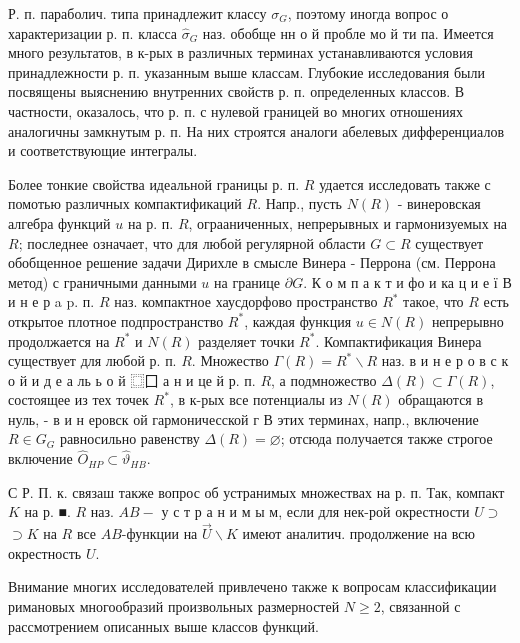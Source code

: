 \documentclass[10pt]{article}
\begin{document}
Р. п. параболич. типа принадлежит классу $\mathfrak{\sigma}_{G}$, поэтому иногда вопрос о характеризации р. п. класса $\widehat{\sigma}_{G}$ наз. обобще нн о й пробле мо й ти па. Имеется много результатов, в к-рых в различных терминах устанавливаются условия принадлежности р. п. указанным выше классам. Глубокие исследования были посвящены выяснению внутренних свойств р. п. определенных классов. В частности, оказалось, что р. п. с нулевой границей во многих отношениях аналогичны замкнутым р. п. На них строятся аналоги абелевых дифференциалов и соответствующие интегралы.



Более тонкие свойства идеальной границы р. п. $R$ удается исследовать также с помотью различных компактификаций $R$. Напр., пусть $N(R)$ - винеровская алгебра функций $u$ на р. п. $R$, ограаниченных, непрерывных и гармонизуемых на $R$; последнее означает, что для любой регулярной области $G \subset R$ существует обобщенное решение задачи Дирихле в смысле Винера - Перрона (см. Перрона метод) с граничными данными $u$ на границе $\partial G$. К о м п а к т и фо и ка ц и е ї В и н е р a p. п. $R$ наз. компактное хаусдорфово пространство $R^{*}$ такое, что $R$ есть открытое плотное подпространство $R^{*}$, каждая функция $u \in N(R)$ непрерывно продолжается на $R^{*}$ и $N(R)$ разделяет точки $R^{*}$. Компактификация Винера существует для любой р. п. $R$. Множество $\Gamma(R)=R^{*} \backslash R$ наз. в и н е р о в с к о й и д е а ль ь о й $\mathbf{⿴ 囗}$ а н и це й р. п. $R$, а подмножество $\Delta(R) \subset \Gamma(R)$, состоящее из тех точек $R^{*}$, в к-рых все потенциалы из $N(R)$ обращаются в нуль, - в и н еровск ой гармоничесской г В этих терминах, напр., включение $R \in G_{G}$ равносильно равенству $\Delta(R)=\varnothing$; отсюда получается также строгое включение $\widehat{O}_{H P} \subset \widehat{\vartheta}_{H B}$.



С Р. П. к. связаш также вопрос об устранимых множествах на р. п. Так, компакт $K$ на р. ■. $R$ наз. $A B-$ у с т р а н и м ы м, если для нек-рой окрестности $U \supset$ $\supset K$ на $R$ все $A B$-функции на $\vec{U} \backslash K$ имеют аналитич. продолжение на всю окрестность $U$.



Внимание многих исследователей привлечено также к вопросам классификации римановых многообразий произвольных размерностей $N \geqslant 2$, связанной с рассмотрением описанных выше классов функций.
\end{document}
